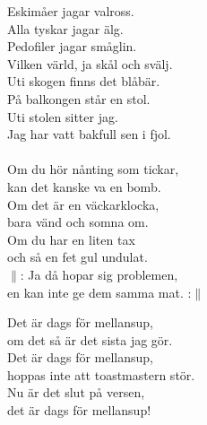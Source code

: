 \documentclass[a6paper, 10pt, twoside]{article}
\begin{document}
\begin{center}
\end{center}
\begin{lyrics}
\small Eskimåer jagar valross.\\
Alla tyskar jagar älg.\\
Pedofiler jagar småglin.\\
Vilken värld, ja skål och svälj.
\vspace{5pt}\\
Uti skogen finns det blåbär.\\
På balkongen står en stol.\\
Uti stolen sitter jag.\\
Jag har vatt bakfull sen i fjol.\\
\vspace{5pt}\\
Om du hör nånting som tickar,\\
kan det kanske va en bomb.\\
Om det är en väckarklocka,\\
bara vänd och somna om.\\
Om du har en liten tax\\
och så en fet gul undulat.\\
$\|$: Ja då hopar sig problemen,\\
en kan inte ge dem samma mat. :$\|$
\end{lyrics}
\begin{center}
\end{center}
\begin{lyrics}
\small Det är dags för mellansup,\\
om det så är det sista jag gör.\\
Det är dags för mellansup,\\ 
hoppas inte att toastmastern stör.\\
Nu är det slut på versen,\\
det är dags för mellansup!
\end{lyrics}
\end{document}
